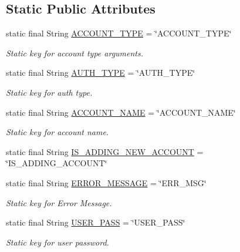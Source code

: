\subsection*{Static Public Attributes}
\begin{DoxyCompactItemize}
\item 
static final String \hyperlink{classuk_1_1ac_1_1swan_1_1digitaltrails_1_1accounts_1_1_authenticator_activity_a20939308ed832362d9f941dff0b19c58}{A\+C\+C\+O\+U\+N\+T\+\_\+\+T\+Y\+P\+E} = \char`\"{}A\+C\+C\+O\+U\+N\+T\+\_\+\+T\+Y\+P\+E\char`\"{}
\begin{DoxyCompactList}\small\item\em Static key for account type arguments. \end{DoxyCompactList}\item 
static final String \hyperlink{classuk_1_1ac_1_1swan_1_1digitaltrails_1_1accounts_1_1_authenticator_activity_add2cd118ad3d0a42986b4db7dd74c7f9}{A\+U\+T\+H\+\_\+\+T\+Y\+P\+E} = \char`\"{}A\+U\+T\+H\+\_\+\+T\+Y\+P\+E\char`\"{}
\begin{DoxyCompactList}\small\item\em Static key for auth type. \end{DoxyCompactList}\item 
static final String \hyperlink{classuk_1_1ac_1_1swan_1_1digitaltrails_1_1accounts_1_1_authenticator_activity_a09f0b9c83c822cfaa7281759dcdd43cc}{A\+C\+C\+O\+U\+N\+T\+\_\+\+N\+A\+M\+E} = \char`\"{}A\+C\+C\+O\+U\+N\+T\+\_\+\+N\+A\+M\+E\char`\"{}
\begin{DoxyCompactList}\small\item\em Static key for account name. \end{DoxyCompactList}\item 
static final String \hyperlink{classuk_1_1ac_1_1swan_1_1digitaltrails_1_1accounts_1_1_authenticator_activity_a38e8ab4c5aca243cf82cccffff9871a7}{I\+S\+\_\+\+A\+D\+D\+I\+N\+G\+\_\+\+N\+E\+W\+\_\+\+A\+C\+C\+O\+U\+N\+T} = \char`\"{}I\+S\+\_\+\+A\+D\+D\+I\+N\+G\+\_\+\+A\+C\+C\+O\+U\+N\+T\char`\"{}
\item 
static final String \hyperlink{classuk_1_1ac_1_1swan_1_1digitaltrails_1_1accounts_1_1_authenticator_activity_a7935a9bbbaea8cc88a666ac96ff5a6d5}{E\+R\+R\+O\+R\+\_\+\+M\+E\+S\+S\+A\+G\+E} = \char`\"{}E\+R\+R\+\_\+\+M\+S\+G\char`\"{}
\begin{DoxyCompactList}\small\item\em Static key for Error Message. \end{DoxyCompactList}\item 
static final String \hyperlink{classuk_1_1ac_1_1swan_1_1digitaltrails_1_1accounts_1_1_authenticator_activity_a8ea4980e7fab8bd02125c9a36bbe4b2d}{U\+S\+E\+R\+\_\+\+P\+A\+S\+S} = \char`\"{}U\+S\+E\+R\+\_\+\+P\+A\+S\+S\char`\"{}
\begin{DoxyCompactList}\small\item\em Static key for user password. \end{DoxyCompactList}\end{DoxyCompactItemize}
